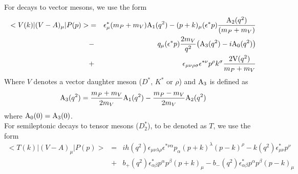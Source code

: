 \noindent
For decays to vector mesons, we use the form
\begin{eqnarray}
<V(k) \vert (V-A)_{\mu} \vert P(p) > & = & 
 \epsilon^*_{\mu} (m_P+m_V) {\rm A}_1(q^2)
- (p+k)_{\mu} ( \epsilon^* p) { { {\rm A}_2(q^2)} \over {(m_P + m_V)}} \\
&-& q_{\mu} ( \epsilon^* p) { {2 m_V} \over {q^2}} \bigl ({\rm A}_3(q^2)
- i{\rm A}_0(q^2) \bigr ) \nonumber
\\
&+&\epsilon_{\mu \nu \rho \sigma} \epsilon^{* \nu} p^{\rho} k^{\sigma}
{ {2 {\rm V}(q^2)} \over { m_P + m_V} } \nonumber
\end{eqnarray}
Where $V$ denotes a vector daughter meson ($D^*$, $K^*$ or $\rho$)
and ${\rm A}_3$ is defined as 
\begin{equation}
{\rm A}_3(q^2) = {{m_P+ m_V} \over {2 m_V}} {\rm A}_1(q^2) -
{{m_P- m_V} \over {2 m_V}} {\rm A}_2(q^2) 
\end{equation}
where ${\rm A}_0 (0) = {\rm A}_3(0)$. \nonumber
\\

\noindent For semileptonic decays to tensor mesons ($D_2^*$), to
be denoted as $T$, we use the form
\begin{eqnarray}
<T(k) \vert (V-A)_{\mu} \vert P(p) > &=& ih(q^2) \epsilon_{\mu \nu \lambda \rho}
\epsilon^{* \nu \alpha} p_{\alpha} (p+k)^{\lambda} (p-k)^{\rho} -
k(q^2) \epsilon^{*}_{\mu \nu} p^{\nu} \\
& + &b_+(q^2) \epsilon^*_{\alpha \beta} p^{\alpha} p^{\beta} (p+k)_{\mu} -
b_-(q^2) \epsilon^*_{\alpha \beta} p^{\alpha} p^{\beta} (p-k)_{\mu} 
\nonumber
\end{eqnarray}

